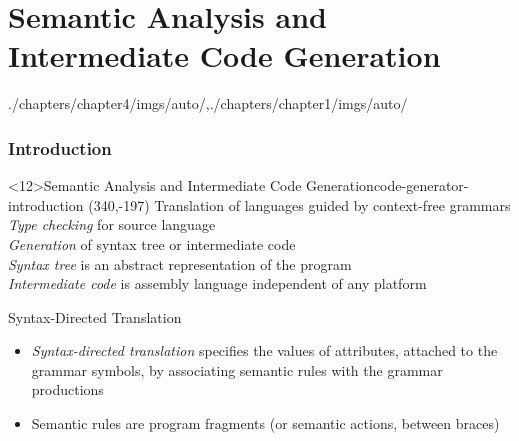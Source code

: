 \part[author={\protect\insertauthor},label={chap:intermediate_code_generation}]{Semantic Analysis and Intermediate Code Generation}

\begin{graphicspathcontext}{{./chapters/chapter4/imgs/auto/},{./chapters/chapter1/imgs/auto/}}
	\begin{bibunit}[apalike]

\tableofcontentslide

\section{Introduction}
\sectiontableofcontentslide

\begin{rightlawnframe}<12>{{Semantic Analysis} and Intermediate Code Generation}{code-generator-introduction}
	\putat*(340,-197){}
	Translation of languages guided by context-free grammars \\[.2cm]
	\emph{Type checking} for source language \\[.2cm]
	\emph{Generation} of syntax tree or intermediate code \\[.2cm]
	\emph{Syntax tree} is an abstract representation of the program \\[.2cm]
	\emph{Intermediate code} is assembly language independent of any platform
\end{rightlawnframe}

\begin{frame}{Syntax-Directed Translation}
	\begin{itemize}
	\item \emph{Syntax-directed translation} specifies the values of attributes, attached to the grammar symbols, by associating semantic rules with the grammar productions \\[.5cm]
		\begin{sdd}
		\sdddots
		\end{sdd}
	\vspace{1em}
	\item Semantic rules are program fragments (or semantic actions, between braces)
	\end{itemize}
\end{frame}


\end{bibunit}
\end{graphicspathcontext}
